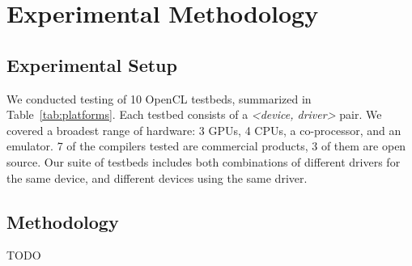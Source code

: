 \section{Experimental Methodology}

\subsection{Experimental Setup}

\begin{table*}[t!]
  \scriptsize %
  \centering %
  
  \caption{%
    OpenCL testbeds, the time spent in automated testing, and the number of bug reports submitted to date.%
  }
  \label{tab:platforms}
\end{table*}

We conducted testing of 10 OpenCL testbeds, summarized in Table~\ref{tab:platforms}. Each testbed consists of a \emph{<device, driver>} pair. We covered a broadest range of hardware: 3 GPUs, 4 CPUs, a co-processor, and an emulator. 7 of the compilers tested are commercial products, 3 of them are open source. Our suite of testbeds includes both combinations of different drivers for the same device, and different devices using the same driver.

\subsection{Methodology}

TODO